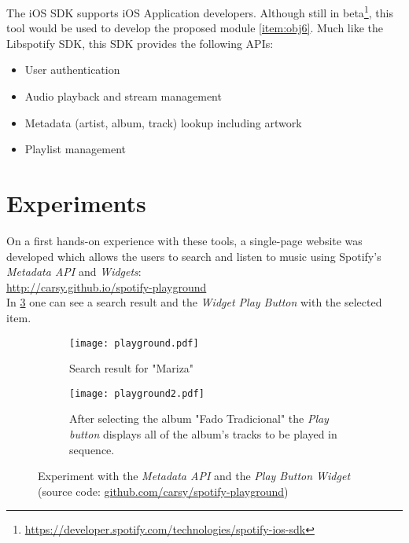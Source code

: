    The iOS SDK supports iOS Application developers. Although still in beta\footnote{\url{https://developer.spotify.com/technologies/spotify-ios-sdk}}, this tool would be used to develop the proposed module \ref{item:obj6}.
    Much like the Libspotify SDK, this SDK provides the following APIs:

    \begin{itemize}
      \item User authentication
      \item Audio playback and stream management
      \item Metadata (artist, album, track) lookup including artwork
      \item Playlist management
    \end{itemize}



  \section{Experiments} %
  \label{sec:experiments}

    On a first hands-on experience with these tools, a single-page website was developed which allows the users to search and listen to music using Spotify's \emph{Metadata API} and \emph{Widgets}: \\

    \url{http://carsy.github.io/spotify-playground} \\

    In \ref{fig:playground} one can see a search result and the \emph{Widget Play Button} with the selected item.

    \begin{figure}
      \centering

      \begin{subfigure}{0.38\textwidth}
        \texttt{[image: playground.pdf]}
        \caption{Search result for "Mariza"}
        \label{fig:playgroun_a}
      \end{subfigure}

      \begin{subfigure}{0.38\textwidth}
        \texttt{[image: playground2.pdf]}
        \caption{After selecting the album "Fado Tradicional" the \emph{Play button} displays all of the album's tracks to be played in sequence.}
        \label{fig:playground_b}
      \end{subfigure}

      \caption{Experiment with the \emph{Metadata API} and the \emph{Play Button Widget} (source code: \url{github.com/carsy/spotify-playground})}
      \label{fig:playground}

    \end{figure}

